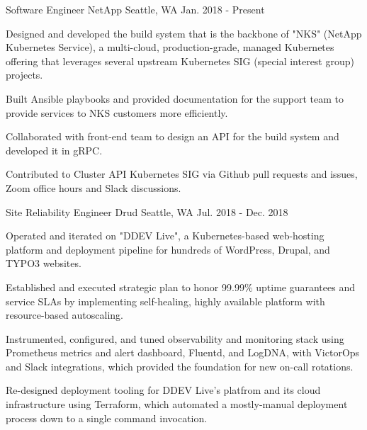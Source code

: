 


\begin{cventries}


\cventry
{Software Engineer} %
{NetApp} %
{Seattle, WA} %
{Jan. 2018 - Present} %
{ %
\begin{cvitems}
\item {Designed and developed the build system that is the backbone of "NKS" (NetApp Kubernetes Service), a multi-cloud, production-grade, managed Kubernetes offering that leverages several upstream Kubernetes SIG (special interest group) projects.}
\item {Built Ansible playbooks and provided documentation for the support team to provide services to NKS customers more efficiently.}
\item {Collaborated with front-end team to design an API for the build system and developed it in gRPC.}
\item {Contributed to Cluster API Kubernetes SIG via Github pull requests and issues, Zoom office hours and Slack discussions.}
\end{cvitems}
}


\cventry
{Site Reliability Engineer} %
{Drud} %
{Seattle, WA} %
{Jul. 2018 - Dec. 2018} %
{ %
\begin{cvitems}
\item {Operated and iterated on "DDEV Live", a Kubernetes-based web-hosting platform and deployment pipeline for hundreds of WordPress, Drupal, and TYPO3 websites.}
\item {Established and executed strategic plan to honor 99.99\% uptime guarantees and service SLAs by implementing self-healing, highly available platform with resource-based autoscaling.}
\item {Instrumented, configured, and tuned observability and monitoring stack using Prometheus metrics and alert dashboard, Fluentd, and LogDNA, with VictorOps and Slack integrations, which provided the foundation for new on-call rotations.}
\item {Re-designed deployment tooling for DDEV Live's platfrom and its cloud infrastructure using Terraform, which automated a mostly-manual deployment process down to a single command invocation.}
\end{cvitems}
}


\end{cventries}
